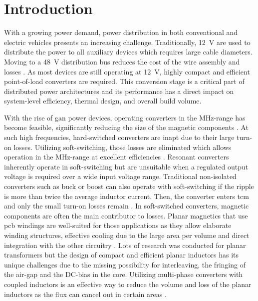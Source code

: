 \documentclass{IPEC2026}
\newcommand{\ac}{\gls}
\begin{document}
\section{Introduction}
With a growing power demand, power distribution in both conventional and electric vehicles presents an increasing challenge. Traditionally, \qty{12}{\V} are used to distribute the power to all auxiliary devices which requires large cable diameters. Moving to a \qty{48}{\V} distribution bus reduces the cost of the wire assembly and losses \cite{kumawatComprehensiveStudyAutomotive2019}. As most devices are still operating at \qty{12}{\V}, highly compact and efficient point-of-load converters are required. This conversion stage is a critical part of distributed power architectures and its performance has a direct impact on system-level efficiency, thermal design, and overall build volume. \par
With the rise of \ac{gan} power devices, operating converters in the MHz-range has become feasible, significantly reducing the size of the magnetic components \cite{weitzHighFrequencyResonant2023}. At such high frequencies, hard-switched converters are inapt due to their large turn-on losses. Utilizing soft-switching, those losses are eliminated which allows operation in the MHz-range at excellent efficiencies \cite{wangReviewHighFrequency2020}. Resonant converters inherently operate in soft-switching but are unsuitable when a regulated output voltage is required over a wide input voltage range. Traditional non-isolated converters such as buck or boost can also operate with soft-switching if the ripple is more than twice the average inductor current. Then, the converter enters \ac{tcm} and only the small turn-on losses remain \cite{marxgutInterleavedTriangularCurrent2010}.
In soft-switched converters, magnetic components are often the main contributor to losses. Planar magnetics that use \ac{pcb} windings are well-suited for those applications as they allow elaborate winding structures, effective cooling due to the large area per volume and direct integration with the other circuitry \cite{wangPCBWindingBasedCoupled2023, liHighFrequencyHigh2018, schaferNovelHighlyEfficient2020, caiOptimalDesignMegahertz2020}. Lots of research was conducted for planar transformers but the design of compact and efficient planar inductors has its unique challenges due to the missing possibility for interleaving, the fringing of the air-gap and the DC-bias in the core.
Utilizing multi-phase converters with coupled inductors is an effective way to reduce the volume and loss of the planar inductors as the flux can cancel out in certain areas \cite{huaUltrathinCoupledInductor2021}. \par
\end{document}
